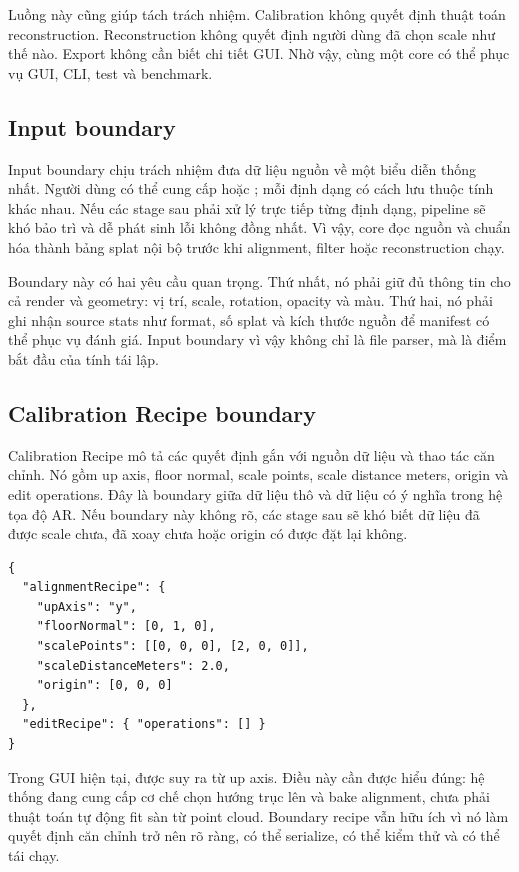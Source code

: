 Luồng này cũng giúp tách trách nhiệm. Calibration không quyết định thuật toán reconstruction. Reconstruction không quyết định người dùng đã chọn scale như thế nào. Export không cần biết chi tiết GUI. Nhờ vậy, cùng một core có thể phục vụ GUI, CLI, test và benchmark.

\subsection{Input boundary}

Input boundary chịu trách nhiệm đưa dữ liệu nguồn về một biểu diễn thống nhất. Người dùng có thể cung cấp  hoặc ; mỗi định dạng có cách lưu thuộc tính khác nhau. Nếu các stage sau phải xử lý trực tiếp từng định dạng, pipeline sẽ khó bảo trì và dễ phát sinh lỗi không đồng nhất. Vì vậy, core đọc nguồn và chuẩn hóa thành bảng splat nội bộ trước khi alignment, filter hoặc reconstruction chạy.

Boundary này có hai yêu cầu quan trọng. Thứ nhất, nó phải giữ đủ thông tin cho cả render và geometry: vị trí, scale, rotation, opacity và màu. Thứ hai, nó phải ghi nhận source stats như format, số splat và kích thước nguồn để manifest có thể phục vụ đánh giá. Input boundary vì vậy không chỉ là file parser, mà là điểm bắt đầu của tính tái lập.

\subsection{Calibration Recipe boundary}

Calibration Recipe mô tả các quyết định gắn với nguồn dữ liệu và thao tác căn chỉnh. Nó gồm up axis, floor normal, scale points, scale distance meters, origin và edit operations. Đây là boundary giữa dữ liệu thô và dữ liệu có ý nghĩa trong hệ tọa độ AR. Nếu boundary này không rõ, các stage sau sẽ khó biết dữ liệu đã được scale chưa, đã xoay chưa hoặc origin có được đặt lại không.

\begin{lstlisting}[language={}]
{
  "alignmentRecipe": {
    "upAxis": "y",
    "floorNormal": [0, 1, 0],
    "scalePoints": [[0, 0, 0], [2, 0, 0]],
    "scaleDistanceMeters": 2.0,
    "origin": [0, 0, 0]
  },
  "editRecipe": { "operations": [] }
}
\end{lstlisting}

Trong GUI hiện tại,  được suy ra từ up axis. Điều này cần được hiểu đúng: hệ thống đang cung cấp cơ chế chọn hướng trục lên và bake alignment, chưa phải thuật toán tự động fit sàn từ point cloud. Boundary recipe vẫn hữu ích vì nó làm quyết định căn chỉnh trở nên rõ ràng, có thể serialize, có thể kiểm thử và có thể tái chạy.

